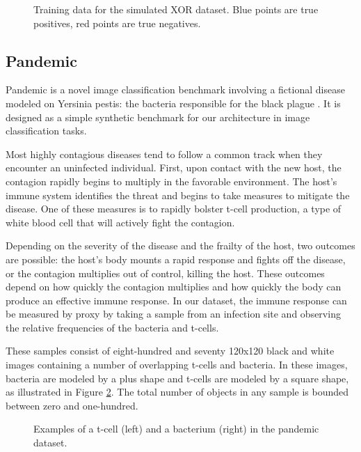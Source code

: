 \begin{figure}[ht]
\caption{Training data for the simulated XOR dataset. Blue points are true positives, red points are true negatives.}

\label{fig:xor}
\centering
\end{figure}

\subsection{Pandemic}

Pandemic is a novel image classification benchmark involving a fictional disease modeled on Yersinia pestis: the bacteria responsible for the black plague \citep{Perry1997YersiniaPlague.}. It is designed as a simple synthetic benchmark for our architecture in image classification tasks.

Most highly contagious diseases tend to follow a common track when they encounter an uninfected individual. First, upon contact with the new host, the contagion rapidly begins to multiply in the favorable environment. The host's immune system identifies the threat and begins to take measures to mitigate the disease. One of these measures is to rapidly bolster t-cell production, a type of white blood cell that will actively fight the contagion. 

Depending on the severity of the disease and the frailty of the host, two outcomes are possible: the host's body mounts a rapid response and fights off the disease, or the contagion multiplies out of control, killing the host. These outcomes depend on how quickly the contagion multiplies and how quickly the body can produce an effective immune response. In our dataset, the immune response can be measured by proxy by taking a sample from an infection site and observing the relative frequencies of the bacteria and t-cells.

These samples consist of eight-hundred and seventy 120x120 black and white images containing a number of overlapping t-cells and bacteria. In these images, bacteria are modeled by a plus shape and t-cells are modeled by a square shape, as illustrated in Figure \ref{fig:pandemic_sample}. The total number of objects in any sample is bounded between zero and one-hundred. 

\begin{figure}
\centering
\begin{subfigure}{.5\textwidth}
  \centering
  
\end{subfigure}%
\begin{subfigure}{.5\textwidth}
  \centering
  
\end{subfigure}
\caption{Examples of a t-cell (left) and a bacterium (right) in the pandemic dataset.}
\label{fig:pandemic_sample}
\end{figure}


